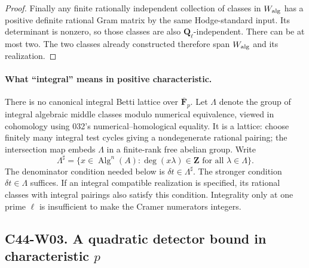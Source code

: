 \documentclass[11pt]{article}
\theoremstyle{remark}\newtheorem{remark}[theorem]{Remark}
\begin{document}
\begin{proof}
Finally any finite rationally independent collection of classes in
$W_{\rm alg}$ has a positive definite rational Gram matrix by the
same Hodge-standard input.  Its determinant is nonzero, so those
classes are also $\mathbf Q_\ell$-independent.  There can be at most
two.  The two classes already constructed therefore span
$W_{\rm alg}$ and its realization.
\end{proof}

\paragraph{What ``integral'' means in positive characteristic.}
There is no canonical integral Betti lattice over $\overline{\mathbf F}_p$.
Let $\Lambda$ denote the group of integral algebraic middle classes
modulo numerical equivalence, viewed in cohomology using 032's
numerical--homological equality.  It is a lattice: choose finitely
many integral test cycles giving a nondegenerate rational pairing;
the intersection map embeds $\Lambda$ in a finite-rank free abelian
group.  Write
\[
 \Lambda^\sharp=\{x\in\operatorname{Alg}^n(A):\deg(x\lambda)\in\mathbf Z
                       \text{ for all }\lambda\in\Lambda\}.
\]
The denominator condition needed below is $\delta t\in\Lambda^\sharp$.
The stronger condition $\delta t\in\Lambda$ suffices.  If an integral
compatible realization is specified, its rational classes with integral
pairings also satisfy this condition.  Integrality only at one prime
$\ell$ is insufficient to make the Cramer numerators integers.

\subsection*{C44-W03. A quadratic detector bound in characteristic $p$}
\end{document}
